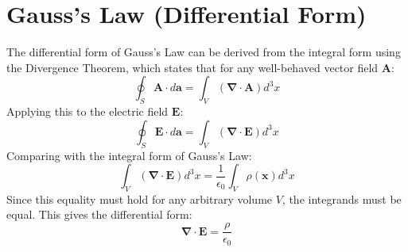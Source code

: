 \documentclass[12pt, a4paper]{article}
\begin{document}
	\section{Gauss's Law (Differential Form)}
	The differential form of Gauss's Law can be derived from the integral form using the Divergence Theorem, which states that for any well-behaved vector field $\bm{A}$:
	\begin{equation}
		\oint_S \bm{A} \cdot d\bm{a} = \int_V (\bm{\nabla} \cdot \bm{A}) d^3x
	\end{equation}
	Applying this to the electric field $\bm{E}$:
	\begin{equation}
		\oint_S \bm{E} \cdot d\bm{a} = \int_V (\bm{\nabla} \cdot \bm{E}) d^3x
	\end{equation}
	Comparing with the integral form of Gauss's Law:
	\begin{equation}
		\int_V (\bm{\nabla} \cdot \bm{E}) d^3x = \frac{1}{\epsilon_0} \int_V \rho(\bm{x}) d^3x
	\end{equation}
	Since this equality must hold for any arbitrary volume $V$, the integrands must be equal. This gives the differential form:
	\begin{equation}
		\bm{\nabla} \cdot \bm{E} = \frac{\rho}{\epsilon_0}
	\end{equation}
	
\end{document}
